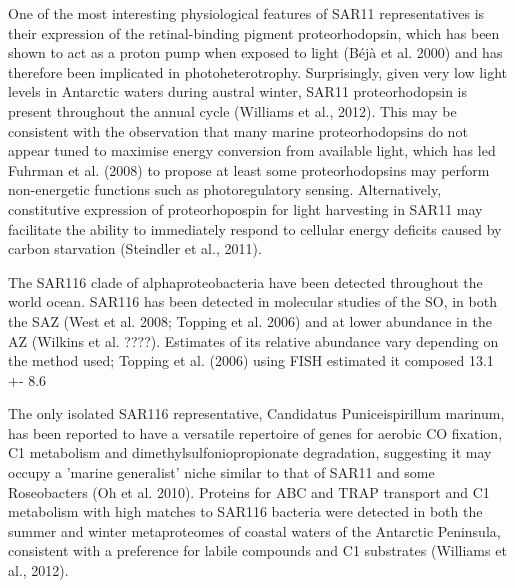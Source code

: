 One of the most interesting physiological features of SAR11 representatives is their expression of the retinal-binding pigment proteorhodopsin, which has been shown to act as a proton pump when exposed to light (Béjà et al. 2000) and has therefore been implicated in photoheterotrophy. Surprisingly, given very low light levels in Antarctic waters during austral winter, SAR11 proteorhodopsin is present throughout the annual cycle (Williams et al., 2012). This may be consistent with the observation that many marine proteorhodopsins do not appear tuned to maximise energy conversion from available light, which has led Fuhrman et al. (2008) to propose at least some proteorhodopsins may perform non-energetic functions such as photoregulatory sensing. Alternatively, constitutive expression of proteorhopospin for light harvesting in SAR11 may facilitate the ability to immediately respond to cellular energy deficits caused by carbon starvation (Steindler et al., 2011).


The SAR116 clade of alphaproteobacteria have been detected throughout the world ocean. SAR116 has been detected in molecular studies of the SO, in both the SAZ (West et al. 2008; Topping et al. 2006) and at lower abundance in the AZ (Wilkins et al. ????). Estimates of its relative abundance vary depending on the method used; Topping et al. (2006) using FISH estimated it composed 13.1 +- 8.6%

The only isolated SAR116 representative, Candidatus Puniceispirillum marinum, has been reported to have a versatile repertoire of genes for aerobic CO fixation, C1 metabolism and dimethylsulfoniopropionate degradation, suggesting it may occupy a 'marine generalist' niche similar to that of SAR11 and some Roseobacters (Oh et al. 2010). Proteins for ABC and TRAP transport and C1 metabolism with high matches to SAR116 bacteria were detected in both the summer and winter metaproteomes of coastal waters of the Antarctic Peninsula, consistent with a preference for labile compounds and C1 substrates (Williams et al., 2012).


